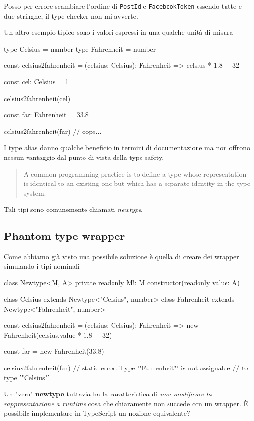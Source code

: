 \documentclass[12pt]{article}
\theoremstyle{definition}
\newenvironment{code}
  {\vspace{0.5cm} \VerbatimEnvironment\begin{typescriptcode}}
  {\end{typescriptcode} \vspace{0.2cm}}
\begin{document}
Posso per errore scambiare l'ordine di \texttt{PostId} e \texttt{FacebookToken} essendo tutte e due stringhe, il type checker non mi avverte.

Un altro esempio tipico sono i valori espressi in una qualche unità di misura

\begin{code}
type Celsius = number
type Fahrenheit = number

const celsius2fahrenheit = (celsius: Celsius): Fahrenheit =>
  celsius * 1.8 + 32

const cel: Celsius = 1

celsius2fahrenheit(cel)

const far: Fahrenheit = 33.8

celsius2fahrenheit(far) // oops...
\end{code}

I type alias danno qualche beneficio in termini di documentazione ma non offrono nessun vantaggio dal punto di vista della type safety.

\begin{quote}
A common programming practice is to define a type whose representation is identical to an existing one but which
has a separate identity in the type system.
\end{quote}

Tali tipi sono comunemente chiamati \emph{newtype}.

\subsection{Phantom type wrapper}

Come abbiamo già visto una possibile soluzione è quella di creare dei wrapper simulando i tipi nominali

\begin{code}
class Newtype<M, A> {
  private readonly M!: M
  constructor(readonly value: A) {}
}

class Celsius extends Newtype<"Celsius", number> {}
class Fahrenheit extends Newtype<"Fahrenheit", number> {}

const celsius2fahrenheit = (celsius: Celsius): Fahrenheit =>
  new Fahrenheit(celsius.value * 1.8 + 32)

const far = new Fahrenheit(33.8)

celsius2fahrenheit(far)
// static error: Type '"Fahrenheit"' is not assignable
// to type '"Celsius"'
\end{code}

Un "vero" \textbf{newtype} tuttavia ha la caratteristica di \emph{non modificare la rappresentazione a runtime} cosa che chiaramente
non succede con un wrapper. È possibile implementare in TypeScript un nozione equivalente?
\end{document}
